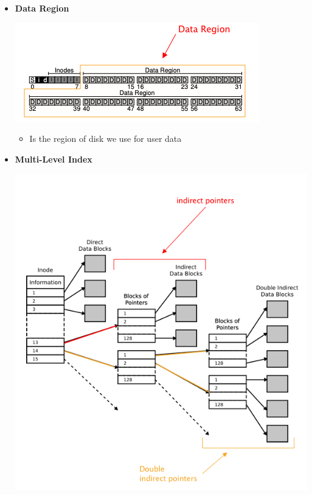 \documentclass[12pt]{article}
\begin{document}
\begin{enumerate}[1.]
\begin{enumerate}[a)]
\begin{itemize}
            \item \textbf{Data Region}

            \begin{center}
            \includegraphics[width=\linewidth]{images/midterm_1_solution_11.png}
            \end{center}

            \begin{itemize}
                \item Is the region of disk we use for user data
            \end{itemize}

            \item \textbf{Multi-Level Index}

            \begin{center}
            \includegraphics[width=\linewidth]{images/midterm_1_solution_13.png}
            \end{center}


\end{itemize}
\end{enumerate}
\end{enumerate}
\end{document}
